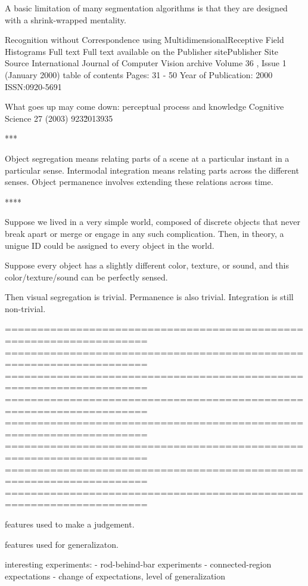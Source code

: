 A basic limitation of many segmentation algorithms is
that they are designed with a shrink-wrapped mentality.





Recognition without Correspondence using MultidimensionalReceptive Field Histograms
Full text 	Full text available on the Publisher sitePublisher Site
Source 	International Journal of Computer Vision archive
Volume 36 ,  Issue 1  (January 2000) table of contents
Pages: 31 - 50  
Year of Publication: 2000
ISSN:0920-5691 

 What goes up may come down: perceptual process and knowledge 
Cognitive Science 27 (2003) 923\u2013935

***

Object segregation means relating parts of a scene at a particular
instant in a particular sense.  Intermodal integration means relating
parts across the different senses.  Object permanence
involves extending these relations across time.

****

Suppose we lived in a very simple world, composed of discrete
objects that never break apart or merge or engage in any such 
complication.  Then, in theory, a unigue ID could be assigned
to every object in the world.

Suppose every object has a slightly different color, texture, or
sound, and this color/texture/sound can be perfectly sensed.

Then visual segregation is trivial.  Permanence is also trivial.
Integration is still non-trivial.

====================================================================
====================================================================
====================================================================
====================================================================
====================================================================
====================================================================
====================================================================
====================================================================

features used to make a judgement.

features used for generalizaton.

interesting experiments:
 - rod-behind-bar experiments
 - connected-region expectations
 - change of expectations, level of generalization


